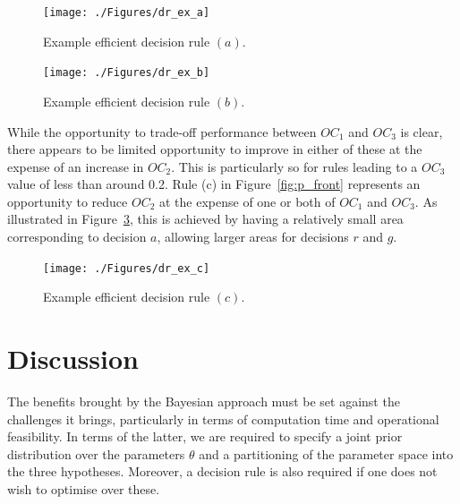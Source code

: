 \documentclass{article} %
\begin{document}
\begin{figure}
\centering
\texttt{[image: ./Figures/dr\_ex\_a]}
\caption{Example efficient decision rule $(a)$.}
\label{fig:rule_a}
\end{figure}

\begin{figure}
\centering
\texttt{[image: ./Figures/dr\_ex\_b]}
\caption{Example efficient decision rule $(b)$.}
\label{fig:rule_b}
\end{figure}

While the opportunity to trade-off performance between $OC_{1}$ and $OC_{3}$ is clear, there appears to be limited opportunity to improve in either of these at the expense of an increase in $OC_{2}$. This is particularly so for rules leading to a $OC_{3}$ value of less than around 0.2. Rule (c) in Figure~\ref{fig:p_front} represents an opportunity to reduce $OC_{2}$ at the expense of one or both of $OC_{1}$ and $OC_{3}$. As illustrated in Figure~\ref{fig:rule_c}, this is achieved by having a relatively small area corresponding to decision $a$, allowing larger areas for decisions $r$ and $g$. 

\begin{figure}
\centering
\texttt{[image: ./Figures/dr\_ex\_c]}
\caption{Example efficient decision rule $(c)$.}
\label{fig:rule_c}
\end{figure}

\section{Discussion}\label{sec:discussion}



The benefits brought by the Bayesian approach must be set against the challenges it brings, particularly in terms of computation time and operational feasibility. In terms of the latter, we are required to specify a joint prior distribution over the parameters $\theta$ and a partitioning of the parameter space into the three hypotheses. Moreover, a decision rule is also required if one does not wish to optimise over these. 
\end{document}
